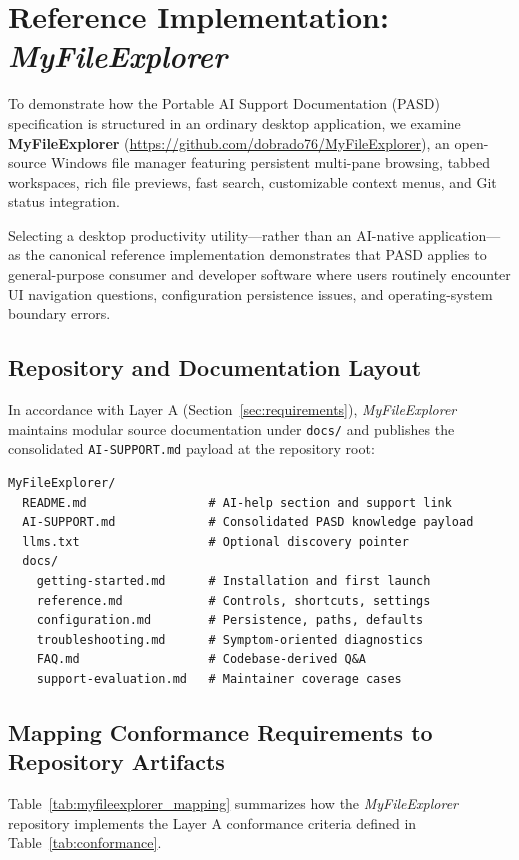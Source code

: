 \documentclass[12pt, a4paper]{article}
\newcommand{\RepoBaseURL}{https://github.com/dobrado76/MyFileExplorer}
\begin{document}
\section{Reference Implementation: \textit{MyFileExplorer}}
\label{app:reference_impl}

To demonstrate how the Portable AI Support Documentation (PASD) specification is structured in an ordinary desktop application, we examine \textbf{MyFileExplorer} (\url{\RepoBaseURL}), an open-source Windows file manager featuring persistent multi-pane browsing, tabbed workspaces, rich file previews, fast search, customizable context menus, and Git status integration.

Selecting a desktop productivity utility---rather than an AI-native application---as the canonical reference implementation demonstrates that PASD applies to general-purpose consumer and developer software where users routinely encounter UI navigation questions, configuration persistence issues, and operating-system boundary errors.

\subsection{Repository and Documentation Layout}
In accordance with Layer A (Section~\ref{sec:requirements}), \textit{MyFileExplorer} maintains modular source documentation under \texttt{docs/} and publishes the consolidated \texttt{AI-SUPPORT.md} payload at the repository root:

\begin{footnotesize}
\begin{verbatim}
MyFileExplorer/
  README.md                 # AI-help section and support link
  AI-SUPPORT.md             # Consolidated PASD knowledge payload
  llms.txt                  # Optional discovery pointer
  docs/
    getting-started.md      # Installation and first launch
    reference.md            # Controls, shortcuts, settings
    configuration.md        # Persistence, paths, defaults
    troubleshooting.md      # Symptom-oriented diagnostics
    FAQ.md                  # Codebase-derived Q&A
    support-evaluation.md   # Maintainer coverage cases
\end{verbatim}
\end{footnotesize}

\subsection{Mapping Conformance Requirements to Repository Artifacts}
Table~\ref{tab:myfileexplorer_mapping} summarizes how the \textit{MyFileExplorer} repository implements the Layer A conformance criteria defined in Table~\ref{tab:conformance}.
\end{document}
